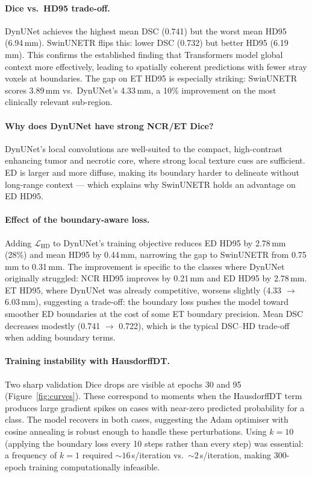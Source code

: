 \documentclass[12pt, letterpaper]{article}
\begin{document}
\paragraph{Dice vs.\ HD95 trade-off.}
DynUNet achieves the highest mean DSC (0.741) but the worst mean HD95 (6.94\,mm).
SwinUNETR flips this: lower DSC (0.732) but better HD95 (6.19\,mm).
This confirms the established finding that Transformers model global context more
effectively, leading to spatially coherent predictions with fewer stray voxels
at boundaries.
The gap on ET HD95 is especially striking: SwinUNETR scores 3.89\,mm vs.\
DynUNet's 4.33\,mm, a 10\% improvement on the most clinically relevant sub-region.

\paragraph{Why does DynUNet have strong NCR/ET Dice?}
DynUNet's local convolutions are well-suited to the compact, high-contrast
enhancing tumor and necrotic core, where strong local texture cues are sufficient.
ED is larger and more diffuse, making its boundary harder to delineate without
long-range context --- which explains why SwinUNETR holds an advantage on ED HD95.

\paragraph{Effect of the boundary-aware loss.}
Adding $\mathcal{L}_{\text{HD}}$ to DynUNet's training objective reduces ED HD95
by 2.78\,mm (28\%) and mean HD95 by 0.44\,mm, narrowing the gap to SwinUNETR
from 0.75\,mm to 0.31\,mm.
The improvement is specific to the classes where DynUNet originally struggled:
NCR HD95 improves by 0.21\,mm and ED HD95 by 2.78\,mm.
ET HD95, where DynUNet was already competitive, worsens slightly (4.33 $\to$
6.03\,mm), suggesting a trade-off: the boundary loss pushes the model toward
smoother ED boundaries at the cost of some ET boundary precision.
Mean DSC decreases modestly (0.741 $\to$ 0.722), which is the typical
DSC--HD trade-off when adding boundary terms.

\paragraph{Training instability with HausdorffDT.}
Two sharp validation Dice drops are visible at epochs 30 and 95
(Figure~\ref{fig:curves}).
These correspond to moments when the HausdorffDT term produces large gradient
spikes on cases with near-zero predicted probability for a class.
The model recovers in both cases, suggesting the Adam optimiser with cosine
annealing is robust enough to handle these perturbations.
Using $k=10$ (applying the boundary loss every 10 steps rather than every step)
was essential: a frequency of $k=1$ required ${\sim}16$\,s/iteration vs.\
${\sim}2$\,s/iteration, making 300-epoch training computationally infeasible.
\end{document}
